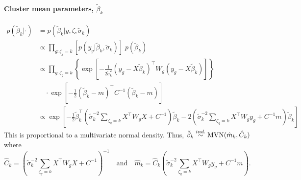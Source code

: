 \paragraph{Cluster mean parameters, $\tilde{\beta}_k$}
\begin{align*}
p(\tilde{\beta}_k|\cdot) & = p(\tilde{\beta}_k|y, \zeta, \tilde{\sigma}_k)\\
& \propto \prod_{g:\zeta_g=k} \left[p(y_g|\tilde{\beta}_k, \tilde{\sigma}_k)\right]\; p(\tilde{\beta}_k)\\
& \propto \prod_{g:\zeta_g=k}  \left\{ \exp \left[ -\frac{1}{2\tilde{\sigma}^2_k} \left( y_g - X\tilde{\beta}_k \right)^\top W_g \left( y_g - X\tilde{\beta}_k \right) \right]\right\}\\
& \quad \cdot \exp \left[ -\frac{1}{2}\left(\tilde{\beta}_k-m\right)^\top C^{-1} \left( \tilde{\beta}_k-m\right)\right]\\
& \propto \exp \left[ -\frac{1}{2} \tilde{\beta}_k^\top \left( \tilde{\sigma}^{-2}_k \sum_{\zeta_g=k} X^\top W_g X + C^{-1} \right) \tilde{\beta}_k - 2 \left( \tilde{\sigma}_k^{-2} \sum_{\zeta_g=k} X^\top W_g y_g + C^{-1} m \right)\tilde{\beta}_k \right]
\end{align*}
This is proportional to a multivariate normal density.
Thus, $\tilde{\beta}_k \stackrel{ind.}{\sim} \operatorname{MVN}(\hat{m}_k,\hat{C}_k)$ where
\begin{equation*}
\hat{C}_k = \left( \tilde{\sigma}^{-2}_k \sum_{\zeta_g=k} X^\top W_g X + C^{-1} \right)^{-1} \quad %
\mbox{and} \quad \hat{m}_k = \hat{C}_k  \left( \tilde{\sigma}_k^{-2} \sum_{\zeta_g=k} X^\top W_g y_g + C^{-1} m \right).
\end{equation*}

